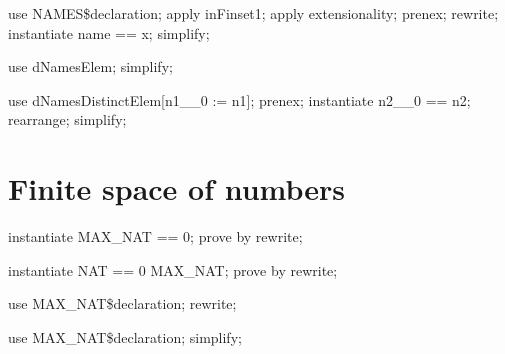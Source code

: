 \begin{LPScript}\begin{zproof}[lExistsName]
    use NAMES\$declaration;
    apply inFinset1;
    apply extensionality;
    prenex;
    rewrite;
    instantiate name == x;
    simplify;
\end{zproof}\end{LPScript}

\begin{LPScript}\begin{zproof}[lExistsDifferentNames]
    use dNamesElem;
    simplify;
\end{zproof}\end{LPScript}

\begin{LPScript}\begin{zproof}[lExistsDifferentNameFromGivenName]
    use dNamesDistinctElem[n1\_\_0 := n1];
    prenex;
    instantiate n2\_\_0 == n2;
    rearrange;
    simplify;
\end{zproof}\end{LPScript}

\section{Finite space of numbers}


\begin{LPScript}\begin{zproof}[tNATBoundaryConsistency]
    instantiate MAX\_NAT == 0;
    prove by rewrite;
\end{zproof}\end{LPScript}

\begin{LPScript}\begin{zproof}[tNATDefinitionConsistency]
    instantiate NAT == 0 \upto MAX\_NAT;
    prove by rewrite;
\end{zproof}\end{LPScript}

\begin{LPScript}\begin{zproof}[gMaxNatMaxType]
    use MAX\_NAT\$declaration;
    rewrite;
\end{zproof}\end{LPScript}

\begin{LPScript}\begin{zproof}[gMaxNatNatType]
    use MAX\_NAT\$declaration;
    simplify;
\end{zproof}\end{LPScript}

